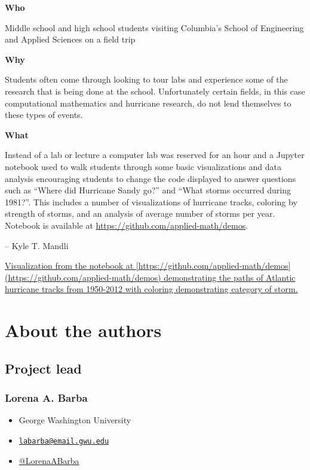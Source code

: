 \documentclass[]{book}
\providecommand{\tightlist}{%
  \setlength{\itemsep}{0pt}\setlength{\parskip}{0pt}}
\begin{document}
\textbf{Who }

Middle school and high school students visiting Columbia's School of
Engineering and Applied Sciences on a field trip

\textbf{Why }

Students often come through looking to tour labs and experience some of
the research that is being done at the school. Unfortunately certain
fields, in this case computational mathematics and hurricane research,
do not lend themselves to these types of events.

\textbf{What }

Instead of a lab or lecture a computer lab was reserved for an hour and
a Jupyter notebook used to walk students through some basic
visualizations and data analysis encouraging students to change the code
displayed to answer questions such as ``Where did Hurricane Sandy go?''
and ``What storms occurred during 1981?''. This includes a number of
visualizations of hurricane tracks, coloring by strength of storms, and
an analysis of average number of storms per year. Notebook is available
at \url{https://github.com/applied-math/demos}.

-- Kyle T. Mandli

\href{images/hurricanes.png}{Visualization from the notebook at
{[}https://github.com/applied-math/demos{]}(https://github.com/applied-math/demos)
demonstrating the paths of Atlantic hurricane tracks from 1950-2012 with
coloring demonstrating category of storm.}

\hypertarget{authors}{\chapter{About the authors}\label{authors}}

\section{Project lead}\label{project-lead}

\subsection*{Lorena A. Barba}\label{lorena-a.-barba}

\begin{itemize}
\tightlist
\item
  George Washington University
\item
  \href{mailto:labarba@email.gwu.edu}{\nolinkurl{labarba@email.gwu.edu}}
\item
  \href{https://twitter.com/LorenaABarba}{@LorenaABarba}
\end{itemize}
\end{document}
